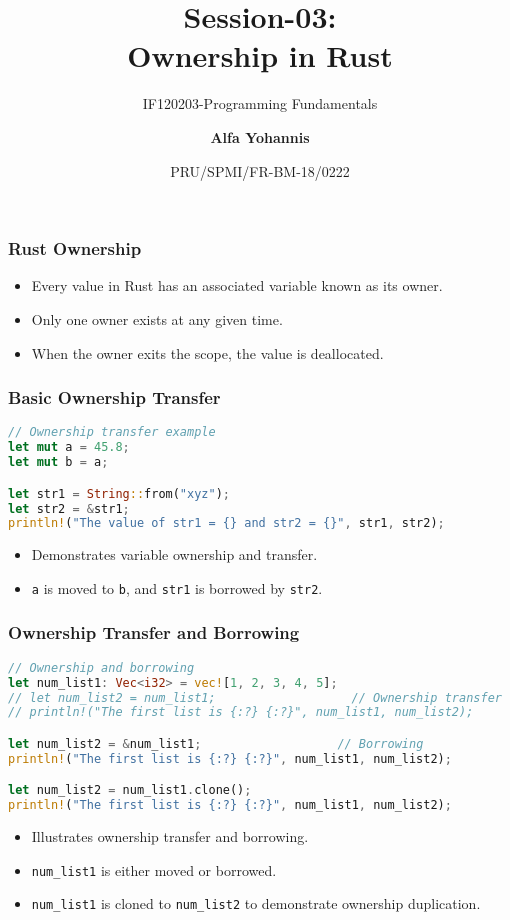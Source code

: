 \documentclass[aspectratio=169, table]{beamer}
\subtitle{IF120203-Programming Fundamentals}
\title{Session-03:\\\LARGE{Ownership in Rust\\}}
\date[Serial]{\scriptsize {PRU/SPMI/FR-BM-18/0222}}
\author[Pradita]{\small{\textbf{Alfa Yohannis}}}
\begin{document}
\frame{\titlepage}

\begin{frame}[fragile]
\frametitle{Rust Ownership}
\begin{itemize}
\item Every value in Rust has an associated variable known as its owner.
\item Only one owner exists at any given time.
\item When the owner exits the scope, the value is deallocated.
\end{itemize}
\end{frame}

\begin{frame}[fragile]
\frametitle{Basic Ownership Transfer}
\begin{lstlisting}[language=Rust]
// Ownership transfer example
let mut a = 45.8; 
let mut b = a;

let str1 = String::from("xyz"); 
let str2 = &str1; 
println!("The value of str1 = {} and str2 = {}", str1, str2);   
\end{lstlisting}
\begin{itemize}
\item Demonstrates variable ownership and transfer.
\item \texttt{a} is moved to \texttt{b}, and \texttt{str1} is borrowed by \texttt{str2}.
\end{itemize}
\end{frame}

\begin{frame}[fragile]
\frametitle{Ownership Transfer and Borrowing}
\vspace{12pt}
\begin{lstlisting}[language=Rust]
// Ownership and borrowing
let num_list1: Vec<i32> = vec![1, 2, 3, 4, 5];  
// let num_list2 = num_list1;                   // Ownership transfer
// println!("The first list is {:?} {:?}", num_list1, num_list2);

let num_list2 = &num_list1;                   // Borrowing
println!("The first list is {:?} {:?}", num_list1, num_list2);

let num_list2 = num_list1.clone();
println!("The first list is {:?} {:?}", num_list1, num_list2);
\end{lstlisting}
\begin{itemize}
\item Illustrates ownership transfer and borrowing.
\item \texttt{num\_list1} is either moved or borrowed.
\item \texttt{num\_list1} is cloned to \texttt{num\_list2} to demonstrate ownership duplication.
\end{itemize}
\end{frame}
\end{document}
